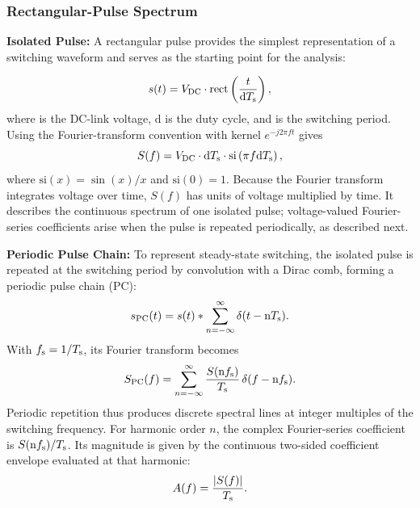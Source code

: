 \subsubsection*{Rectangular-Pulse Spectrum}
\textbf{Isolated Pulse:} A rectangular pulse provides the simplest representation of a switching waveform and serves as the starting point for the analysis:

\begin{equation}
	s(t) = {V}_{\mathrm{DC}}\cdot\text{rect}\left(\frac{t}{\text{d}{T}_{\mathrm{s}}}\right), 
\end{equation}
where  is the DC-link voltage, $\text{d}$ is the duty cycle, and  is the switching period.
Using the Fourier-transform convention with kernel $e^{-j2\pi ft}$ gives
\begin{equation}
	S(f) = {V}_{\mathrm{DC}}\cdot\text{d}{T}_{\mathrm{s}}\cdot\text{si}\left(\pi f\text{d}{T}_{\mathrm{s}}\right),
\end{equation}
where $\text{si}(x) = \sin(x)/x$ and $\text{si}(0) = 1$.
Because the Fourier transform integrates voltage over time, $S(f)$ has units of voltage multiplied by time. It describes the continuous spectrum of one isolated pulse; voltage-valued Fourier-series coefficients arise when the pulse is repeated periodically, as described next.

\textbf{Periodic Pulse Chain:} To represent steady-state switching, the isolated pulse is repeated at the switching period by convolution with a Dirac comb, forming a periodic pulse chain (PC):
\begin{equation}
	{s}_{\mathrm{PC}}(t) = s(t) * \sum_{n=-\infty}^{\infty} \delta(t-\text{n}{T}_{\mathrm{s}}).
\end{equation}
With ${f}_{\mathrm{s}} = 1/{T}_{\mathrm{s}}$, its Fourier transform becomes
\begin{equation}
	{S}_{\mathrm{PC}}(f) = \sum_{n=-\infty}^{\infty} \frac{S(\text{n}{f}_{\mathrm{s}})}{{T}_{\mathrm{s}}}\,\delta(f-\text{n}{f}_{\mathrm{s}}).
\end{equation}
Periodic repetition thus produces discrete spectral lines at integer multiples of the switching frequency.
For harmonic order $n$, the complex Fourier-series coefficient is $S(\text{n}{f}_{\mathrm{s}})/{T}_{\mathrm{s}}$.
Its magnitude is given by the continuous two-sided coefficient envelope evaluated at that harmonic:
\begin{equation}
A(f) = \frac{|S(f)|}{{T}_{\mathrm{s}}}.
\end{equation}



